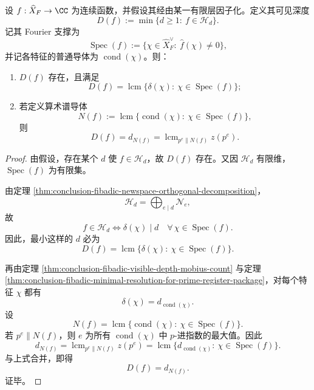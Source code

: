 \begin{theorem}[有限层连续观测的谱导体定理]\label{thm:conclusion-fibadic-finite-layer-observable-spectral-conductor}
设 \(f:\widehat X_F\to \CC\) 为连续函数，并假设其经由某一有限层因子化。定义其可见深度
\[
D(f):=\min\{d\ge 1:\ f\in \mathcal H_d\}.
\]
记其 Fourier 支撑为
\[
\operatorname{Spec}(f):=\{\chi\in \widehat X_F^\vee:\ \widehat f(\chi)\neq 0\},
\]
并记各特征的普通导体为 \(\operatorname{cond}(\chi)\)。则：
\begin{enumerate}
  \item \(D(f)\) 存在，且满足
  \[
  D(f)=\operatorname{lcm}\{\delta(\chi):\ \chi\in \operatorname{Spec}(f)\};
  \]
  \item 若定义算术谱导体
  \[
  N(f):=\operatorname{lcm}\{\operatorname{cond}(\chi):\ \chi\in \operatorname{Spec}(f)\},
  \]
  则
  \[
  D(f)=d_{N(f)}
  =
  \operatorname{lcm}_{p^e\parallel N(f)} z(p^e).
  \]
\end{enumerate}
\end{theorem}
\begin{proof}
由假设，存在某个 \(d\) 使 \(f\in\mathcal H_d\)，故 \(D(f)\) 存在。又因 \(\mathcal H_d\) 有限维，\(\operatorname{Spec}(f)\) 为有限集。

由定理 \ref{thm:conclusion-fibadic-newspace-orthogonal-decomposition}，
\[
\mathcal H_d=\bigoplus_{e\mid d}\mathcal N_e,
\]
故
\[
f\in \mathcal H_d
\iff
\delta(\chi)\mid d \quad \forall\,\chi\in \operatorname{Spec}(f).
\]
因此，最小这样的 \(d\) 必为
\[
D(f)=\operatorname{lcm}\{\delta(\chi):\ \chi\in \operatorname{Spec}(f)\}.
\]

再由定理 \ref{thm:conclusion-fibadic-visible-depth-mobius-count} 与定理 \ref{thm:conclusion-fibadic-minimal-resolution-for-prime-register-package}，对每个特征 \(\chi\) 都有
\[
\delta(\chi)=d_{\operatorname{cond}(\chi)}.
\]
设
\[
N(f)=\operatorname{lcm}\{\operatorname{cond}(\chi):\ \chi\in \operatorname{Spec}(f)\}.
\]
若 \(p^e\parallel N(f)\)，则 \(e\) 为所有 \(\operatorname{cond}(\chi)\) 中 \(p\)-进指数的最大值。因此
\[
d_{N(f)}
=
\operatorname{lcm}_{p^e\parallel N(f)} z(p^e)
=
\operatorname{lcm}\{d_{\operatorname{cond}(\chi)}:\ \chi\in \operatorname{Spec}(f)\}.
\]
与上式合并，即得
\[
D(f)=d_{N(f)}.
\]
证毕。
\end{proof}

